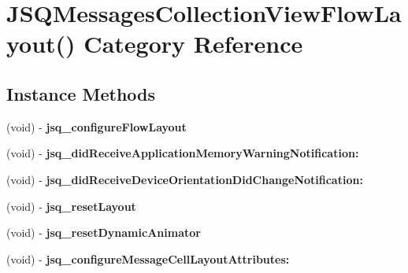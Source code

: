 \hypertarget{category_j_s_q_messages_collection_view_flow_layout_07_08}{}\section{J\+S\+Q\+Messages\+Collection\+View\+Flow\+Layout() Category Reference}
\label{category_j_s_q_messages_collection_view_flow_layout_07_08}
\subsection*{Instance Methods}
\begin{DoxyCompactItemize}
\item 
\hypertarget{category_j_s_q_messages_collection_view_flow_layout_07_08_add1ae87d5cabf5e855f74b790a81fb52}{}(void) -\/ {\bfseries jsq\+\_\+configure\+Flow\+Layout}\label{category_j_s_q_messages_collection_view_flow_layout_07_08_add1ae87d5cabf5e855f74b790a81fb52}

\item 
\hypertarget{category_j_s_q_messages_collection_view_flow_layout_07_08_a2eb891eae81e9558ad2cabf383c92cff}{}(void) -\/ {\bfseries jsq\+\_\+did\+Receive\+Application\+Memory\+Warning\+Notification\+:}\label{category_j_s_q_messages_collection_view_flow_layout_07_08_a2eb891eae81e9558ad2cabf383c92cff}

\item 
\hypertarget{category_j_s_q_messages_collection_view_flow_layout_07_08_afc22ca97c90c58693416d582208cbb4b}{}(void) -\/ {\bfseries jsq\+\_\+did\+Receive\+Device\+Orientation\+Did\+Change\+Notification\+:}\label{category_j_s_q_messages_collection_view_flow_layout_07_08_afc22ca97c90c58693416d582208cbb4b}

\item 
\hypertarget{category_j_s_q_messages_collection_view_flow_layout_07_08_ab130ed234c66978d9611ef228288e407}{}(void) -\/ {\bfseries jsq\+\_\+reset\+Layout}\label{category_j_s_q_messages_collection_view_flow_layout_07_08_ab130ed234c66978d9611ef228288e407}

\item 
\hypertarget{category_j_s_q_messages_collection_view_flow_layout_07_08_a0a251147781a59d7b17e0fa10656dadb}{}(void) -\/ {\bfseries jsq\+\_\+reset\+Dynamic\+Animator}\label{category_j_s_q_messages_collection_view_flow_layout_07_08_a0a251147781a59d7b17e0fa10656dadb}

\item 
\hypertarget{category_j_s_q_messages_collection_view_flow_layout_07_08_aa9b867f4d6ded0dbc32bd304b0eefda6}{}(void) -\/ {\bfseries jsq\+\_\+configure\+Message\+Cell\+Layout\+Attributes\+:}\label{category_j_s_q_messages_collection_view_flow_layout_07_08_aa9b867f4d6ded0dbc32bd304b0eefda6}


\end{DoxyCompactItemize}
